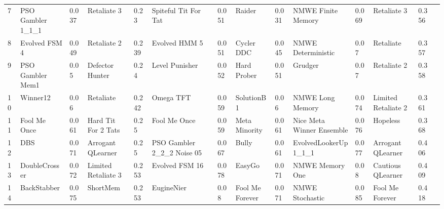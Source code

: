 \begin{tabular}{lggllggllggllr}
    7  &        PSO Gambler 1\_1\_1 &     0.037 &            Retaliate 3 &      0.23 &        Spiteful Tit For Tat &     0.051 &             Raider &     0.031 &         NMWE Finite Memory &     0.069 &          Retaliate 3 &     0.356 \\
    8  &            Evolved FSM 4 &     0.049 &            Retaliate 2 &     0.239 &               Evolved HMM 5 &     0.051 &         Cycler DDC &     0.045 &         NMWE Deterministic &      0.07 &            Retaliate &     0.357 \\
    9  &         PSO Gambler Mem1 &      0.05 &        Defector Hunter &      0.24 &              Level Punisher &     0.052 &        Hard Prober &     0.051 &                    Grudger &      0.07 &          Retaliate 2 &     0.358 \\
    10 &                 Winner12 &      0.06 &              Retaliate &     0.242 &                   Omega TFT &     0.059 &         SolutionB1 &      0.06 &           NMWE Long Memory &     0.074 &  Limited Retaliate 2 &     0.361 \\
    11 &             Fool Me Once &     0.061 &    Hard Tit For 2 Tats &      0.25 &                Fool Me Once &     0.059 &      Meta Minority &     0.061 &  Nice Meta Winner Ensemble &     0.076 &             Hopeless &     0.368 \\
    12 &                      DBS &     0.071 &      Arrogant QLearner &      0.25 &  PSO Gambler 2\_2\_2 Noise 05 &     0.067 &              Bully &     0.061 &       EvolvedLookerUp1\_1\_1 &     0.077 &    Arrogant QLearner &     0.406 \\
    13 &            DoubleCrosser &     0.072 &    Limited Retaliate 3 &     0.253 &              Evolved FSM 16 &     0.078 &             EasyGo &     0.071 &            NMWE Memory One &      0.08 &    Cautious QLearner &     0.409 \\
    14 &              BackStabber &     0.075 &               ShortMem &     0.253 &                  EugineNier &      0.08 &    Fool Me Forever &     0.071 &            NMWE Stochastic &     0.085 &      Fool Me Forever &     0.418 \\
    \bottomrule
    \end{tabular}
    